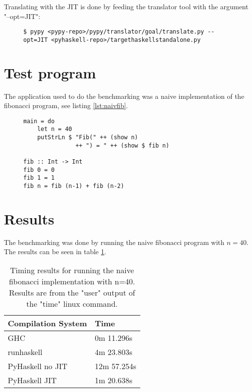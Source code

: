 Translating with the JIT is done by feeding the translator tool with the argument "--opt=JIT":

\begin{figure}[H]
\lstset{ %
language=bash,
}
\begin{lstlisting}
$ pypy <pypy-repo>/pypy/translator/goal/translate.py --opt=JIT <pyhaskell-repo>/targethaskellstandalone.py
\end{lstlisting}

\end{figure}




\section{Test program}

The application used to do the benchmarking was a naive implementation of the 
fibonacci program, see listing \ref{lst:naivfib}.

\begin{figure}[H]

\lstset{ %
language=Python,
caption=Naive fibonacci implementation in Haskell,
label=lst:naivfib
}
\begin{lstlisting}
main = do 
    let n = 40
    putStrLn $ "Fib(" ++ (show n) 
               ++ ") = " ++ (show $ fib n)

fib :: Int -> Int
fib 0 = 0
fib 1 = 1
fib n = fib (n-1) + fib (n-2)
\end{lstlisting}

\end{figure}

\section{Results}

The benchmarking was done by running the naive fibonacci program with $n=40$. 
The results can be seen in table 
\ref{tab:benchmarks}. 

\begin{table}[H]

\centering
\begin{tabular}{l|l}
\hline
\hline
Compilation System & Time \\
\hline
GHC               & 0m 11.296s  \\
runhaskell        & 4m 23.803s \\ 
PyHaskell no JIT  & 12m 57.254s \\
PyHaskell JIT     & 1m 20.638s \\
\hline
\end{tabular}

\caption{Timing results for running the naive fibonacci implementation with n=40. Results
are from the "user" output of the "time" linux command.}
\label{tab:benchmarks}

\end{table}


